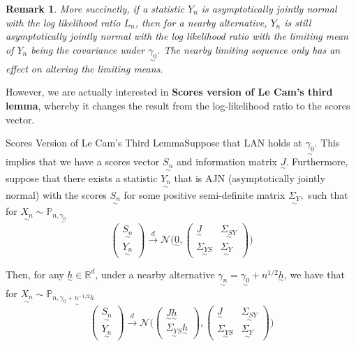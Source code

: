 \documentclass[twoside]{article}
\newtheorem{remark}[theorem]{Remark}
\newcommand{\real}{\mathbb{R}}
\newcommand{\prob}{\mathbb{P}}
\newcommand{\utilde}{\underset{\sim}}
\begin{document}
\begin{remark} More succinctly, if a statistic $Y_n$ is asymptotically jointly normal with the log likelihood ratio $L_n$, then for a nearby alternative, $Y_n$ is still asymptotically jointly normal with the log likelihood ratio with the limiting mean of $Y_n$ being the covariance under $\utilde{\gamma_0}$. The nearby limiting sequence only has an effect on altering the limiting means.
\end{remark}



However, we are actually interested in \textbf{Scores version of Le Cam's third lemma}, whereby it changes the result from the log-likelihood ratio to the scores vector.


\begin{proposition_exam}{Scores Version of Le Cam's Third Lemma}{}Suppose that LAN holds at $\utilde{\gamma_{0}}$. This implies that we have a scores vector $\utilde{S_n}$ and information matrix $\utilde{J}.$ Furthermore, suppose that there exists a statistic $\utilde{Y_n}$ that is AJN (asymptotically jointly normal) with the scores $\utilde{S_{n}}$ for some positive semi-definite matrix $\utilde{\Sigma_{Y}},$ such that for $\utilde{X_{n}} \sim \prob_{n, \utilde{\gamma_{0}}}$
\begin{equation}
\begin{pmatrix}
\utilde{S_n}\\
\utilde{Y_n}
\end{pmatrix}
\xrightarrow{d}
\mathcal{N}\bigg(
\utilde{0}
,
\begin{pmatrix}
\utilde{J} & \utilde{\Sigma_{SY}} \\
\utilde{\Sigma_{YS}} & \utilde{\Sigma_Y}
\end{pmatrix}
 \bigg)
 \tag{*}
\end{equation}


Then, for any $\utilde{h} \in \real^d$, under a nearby alternative $\utilde{\gamma_{n}} = \utilde{\gamma_0} + n^{1/2}\utilde{h}$, we have that for $\utilde{X_{n}} \sim \prob_{n, \utilde{\gamma_{0} + n^{-1/2}h}}$ 
\begin{equation}
\begin{pmatrix}
\utilde{S_n}\\
\utilde{Y_n}
\end{pmatrix}
\xrightarrow{d}
\mathcal{N}\bigg(
\begin{pmatrix}
\utilde{J}\utilde{h}\\
\utilde{\Sigma_{YS}}\utilde{h}
\end{pmatrix}
  ,
\begin{pmatrix}
\utilde{J} & \utilde{\Sigma_{SY}} \\
\utilde{\Sigma_{YS}} & \utilde{\Sigma_Y} 
\end{pmatrix}
 \bigg)
\end{equation}
\end{proposition_exam}
\end{document}
